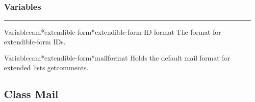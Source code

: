 \subsubsection*{Variables}
\par\vspace*{0.00in}\par\hrule\par\medskip\par


\begin{functiondoc}{Variable}{cam*extendible-form*extendible-form-ID-format}{}
The format for extendible-form IDs.
\end{functiondoc}

\begin{functiondoc}{Variable}{cam*extendible-form*mailformat}{}
Holds the default mail format for extended lists getcomments.
\end{functiondoc}


\clearpage

\subsection{Class Mail}


